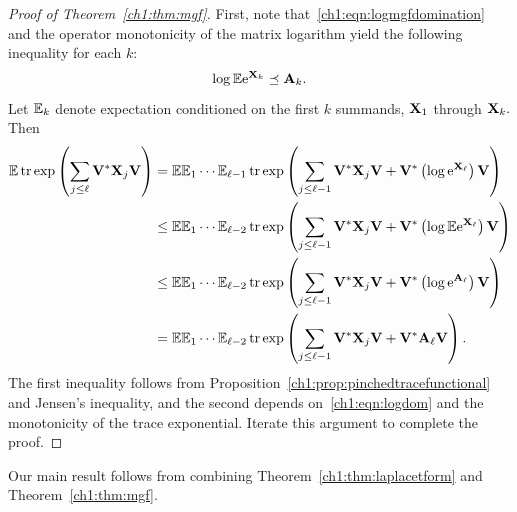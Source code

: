 \begin{proof}[Proof of Theorem~\ref{ch1:thm:mgf}]
 First, note that~\eqref{ch1:eqn:logmgfdomination} and the operator monotonicity of
the matrix logarithm yield the following inequality for each $k$: 
\begin{equation}
\log \mathbb{E} \mathrm{e}^{\mathbf{X}_k} \preceq \mathbf{A}_k.
\label{ch1:eqn:logdom}
\end{equation}
Let $\mathbb{E}_k$ denote expectation conditioned on the first $k$ summands, $\mathbf{X}_1$
through $\mathbf{X}_k.$ Then
\begin{align*}
 \mathbb{E} \operatorname{tr}\mathrm{exp}\left(\sum_{j \leq \ell} \mathbf{V}^* \mathbf{X}_j \mathbf{V}\right) & = \mathbb{E}\mathbb{E}_1\cdots
\mathbb{E}_{\ell-1} \operatorname{tr}\mathrm{exp}\left(\sum_{j \leq \ell-1} \mathbf{V}^* \mathbf{X}_j \mathbf{V} +
\mathbf{V}^* \left( \log \mathrm{e}^{\mathbf{X}_\ell} \right) \mathbf{V}\right) \\
 & \leq \mathbb{E}\mathbb{E}_1\cdots \mathbb{E}_{\ell-2} \operatorname{tr}\mathrm{exp}\left(\sum_{j \leq \ell-1} \mathbf{V}^*
\mathbf{X}_j \mathbf{V} + \mathbf{V}^* \left( \log\mathbb{E}\mathrm{e}^{\mathbf{X}_\ell} \right)
\mathbf{V}\right) \\
 & \leq \mathbb{E}\mathbb{E}_1\cdots \mathbb{E}_{\ell-2} \operatorname{tr}\mathrm{exp}\left(\sum_{j \leq \ell-1} \mathbf{V}^*
\mathbf{X}_j \mathbf{V} + \mathbf{V}^* \left( \log\mathrm{e}^{\mathbf{A}_\ell} \right) \mathbf{V} \right)
\\
 & = \mathbb{E}\mathbb{E}_1\cdots \mathbb{E}_{\ell-2} \operatorname{tr}\mathrm{exp}\left(\sum_{j \leq \ell-1} \mathbf{V}^*
\mathbf{X}_j \mathbf{V} + \mathbf{V}^* \mathbf{A}_\ell \mathbf{V} \right).
\end{align*}
The first inequality follows from Proposition~\ref{ch1:prop:pinchedtracefunctional}
and Jensen's inequality, and the second depends on~\eqref{ch1:eqn:logdom} and the
monotonicity of the trace exponential. Iterate this argument to complete the
proof.
\end{proof}


Our main result follows from combining Theorem~\ref{ch1:thm:laplacetform} and
Theorem~\ref{ch1:thm:mgf}.

